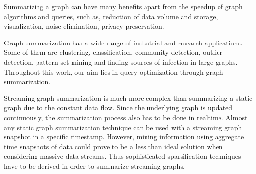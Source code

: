 Summarizing a graph can have many benefits\cite{liu_graph_2018} apart from the speedup of graph algorithms and queries, such as, reduction of data volume and storage\cite{seo_effective_2018}, visualization\cite{dunne_motif_2013, jin_eco_nodate}, noise elimination\cite{zhang_discovery-driven_2010}, privacy preservation\cite{shoaran_zero-knowledge_2013}. 

Graph summarization has a wide range of industrial and research applications. Some of them are clustering\cite{cilibrasi_clustering_2005}, classification\cite{hutchison_compression_2006}, community detection\cite{chakrabarti_fully_nodate}, outlier detection\cite{smets_odd_2011, akoglu_opavion_2012}, pattern set mining\cite{mampaey_tell_2011} and finding sources of infection in large graphs\cite{prakash_spotting_2012}. Throughout this work, our aim lies in query optimization through graph summarization.

Streaming graph summarization is much more complex than summarizing a static graph due to the constant data flow. Since the underlying graph is updated continuously, the summarization process also has to be done in realtime. Almost any static graph summarization technique can be used with a streaming graph snapshot in a specific timestamp. However, mining information using aggregate time snapshots of data could prove to be a less than ideal solution when considering massive data streams. Thus sophisticated sparsification techniques have to be derived in order to summarize streaming graphs.